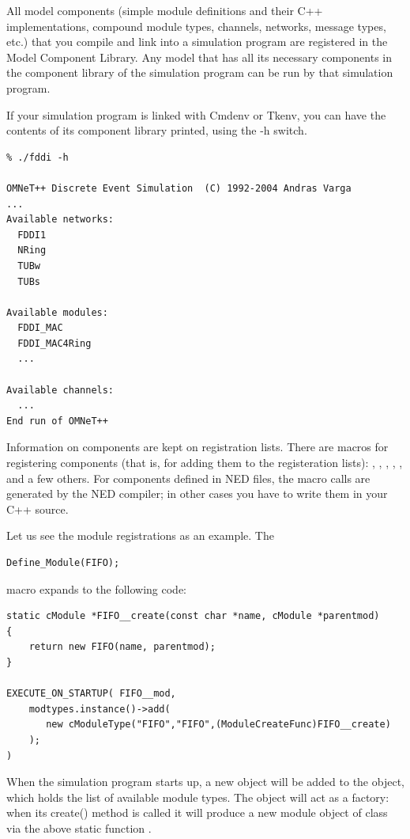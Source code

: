 All model components (simple module definitions and their C++
implementations, compound module types, channels, networks,
message types, etc.) that you compile and link into a simulation
program are registered in the Model Component Library.
Any model that has all its necessary components in the
component library of the simulation program can be run by that
simulation program.

If your simulation program is linked with Cmdenv or Tkenv,
you can have the contents of its component library printed,
using the -h switch.

\begin{verbatim}
% ./fddi -h

OMNeT++ Discrete Event Simulation  (C) 1992-2004 Andras Varga
...
Available networks:
  FDDI1
  NRing
  TUBw
  TUBs

Available modules:
  FDDI_MAC
  FDDI_MAC4Ring
  ...

Available channels:
  ...
End run of OMNeT++
\end{verbatim}

Information on components are kept on registration lists.
There are macros for registering components (that is, for adding
them to the registeration lists):
, ,
, ,
, and a few others. For components defined
in NED files, the macro calls are generated by the NED compiler;
in other cases you have to write them in your C++ source.

Let us see the module registrations as an example. The

\begin{verbatim}
Define_Module(FIFO);
\end{verbatim}

macro expands to the following code:

\begin{verbatim}
static cModule *FIFO__create(const char *name, cModule *parentmod)
{
    return new FIFO(name, parentmod);
}

EXECUTE_ON_STARTUP( FIFO__mod,
    modtypes.instance()->add(
       new cModuleType("FIFO","FIFO",(ModuleCreateFunc)FIFO__create)
    );
)
\end{verbatim}

When the simulation program starts up, a new 
object will be added to the  object, which holds the list
of available module types. The  object will act as a factory:
when its create() method is called it will produce a new module object
of class  via the above static function .

